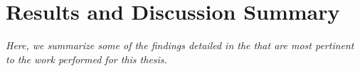 



\section{Results and Discussion Summary}\label{snrcat:resSum}
\emph{Here, we summarize some of the findings detailed in the \snrcat{} that are most pertinent to the work performed for this thesis.} 

